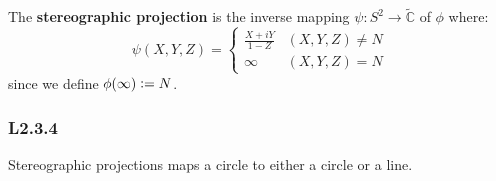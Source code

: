 \documentclass{article}
\newcommand{\deq}{\vcentcolon=}
\begin{document}
\begin{multicols*}{3}
The \textbf{stereographic projection} is the inverse mapping
$\psi:S^2\rightarrow\widetilde{\mathbb{C}}$ of $\phi$ where:
$$\psi(X,Y,Z)=\left\{\begin{array}{ll}
    \frac{X+iY}{1-Z} & (X,Y,Z)\neq N \\
    \infty & (X,Y,Z)=N
\end{array}\right.$$
since we define $\phi(\infty)\deq N$.

\subsubsection*{L2.3.4}
Stereographic projections maps a circle
to either a circle or a line.

\end{multicols*}
\end{document}
